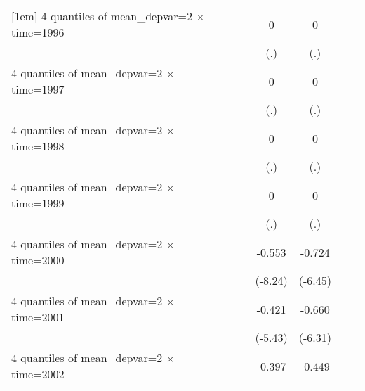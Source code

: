 \begin{table}[htbp]
\begin{tabular}{l*{6}{c}}
[1em]
4 quantiles of mean\_depvar=2 $\times$ time=1996&                     &                     &           0         &           0         &                     &                     \\
                    &                     &                     &         (.)         &         (.)         &                     &                     \\
[1em]
4 quantiles of mean\_depvar=2 $\times$ time=1997&                     &                     &           0         &           0         &                     &                     \\
                    &                     &                     &         (.)         &         (.)         &                     &                     \\
[1em]
4 quantiles of mean\_depvar=2 $\times$ time=1998&                     &                     &           0         &           0         &                     &                     \\
                    &                     &                     &         (.)         &         (.)         &                     &                     \\
[1em]
4 quantiles of mean\_depvar=2 $\times$ time=1999&                     &                     &           0         &           0         &                     &                     \\
                    &                     &                     &         (.)         &         (.)         &                     &                     \\
[1em]
4 quantiles of mean\_depvar=2 $\times$ time=2000&                     &                     &      -0.553\sym{***}&      -0.724\sym{***}&                     &                     \\
                    &                     &                     &     (-8.24)         &     (-6.45)         &                     &                     \\
[1em]
4 quantiles of mean\_depvar=2 $\times$ time=2001&                     &                     &      -0.421\sym{***}&      -0.660\sym{***}&                     &                     \\
                    &                     &                     &     (-5.43)         &     (-6.31)         &                     &                     \\
[1em]
4 quantiles of mean\_depvar=2 $\times$ time=2002&                     &                     &      -0.397\sym{***}&      -0.449\sym{***}&                     &                     \\

\end{tabular}
\end{table}

